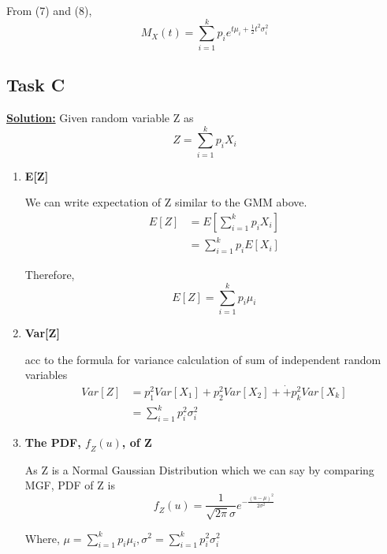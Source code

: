 \documentclass[12pt]{article}
\begin{document}
\begin{enumerate}
From (7) and (8),
\begin{equation}
    M_X(t) = \sum_{i=1}^k p_ie^{t\mu_i + \frac{1}{2}t^2\sigma_i^2}
\end{equation}
\end{enumerate}

\subsection{Task C}
\textbf{\underline{Solution:}}
Given random variable Z as
\begin{equation}
    Z = \sum_{i=1}^kp_iX_i
\end{equation}
\begin{enumerate}
    \item \textbf{E[Z]}

We can write expectation of Z similar to the GMM above.
\begin{equation}
\begin{split}
    E[Z]& = E[\sum_{i=1}^kp_iX_i] \\
    & = \sum_{i=1}^kp_iE[X_i]
\end{split}
\end{equation}

Therefore,
\begin{equation}
    E[Z] = \sum_{i=1}^kp_i\mu_i
\end{equation}

    \item \textbf{Var[Z]}

acc to the formula for variance calculation of sum of independent random variables
\begin{equation}
\begin{split}
    Var[Z]& = p_1^2Var[X_1]+p_2^2Var[X_2]+\dot+p_k^2Var[X_k] \\
    & = \sum_{i=1}^k p_i^2\sigma^2_i
\end{split}
\end{equation}



    \item \textbf{The PDF, $\textit{f}_Z(u)$, of Z}

As Z is a Normal Gaussian Distribution which we can say by comparing MGF, PDF of Z is
\begin{equation}
    \textit{f}_Z(u) = \frac{1}{\sqrt{2\pi}\sigma}e^{-\frac{(u-\mu)^2}{2\sigma^2}}
\end{equation}
\begin{center}
    Where,  
          $\mu = \sum_{i=1}^kp_i\mu_i,   \sigma^2 = \sum_{i=1}^kp_i^2\sigma^2_i$
\end{center}


\end{enumerate}
\end{document}
